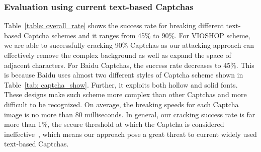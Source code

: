 \subsubsection{Evaluation using current text-based Captchas}
Table~\ref{table: overall_rate} shows the success rate for breaking different text-based Captcha schemes and it ranges from 45\% to 90\%. For VIOSHOP scheme, we are able to successfully cracking 90\% Captchas as our attacking approach can effectively remove the complex background as well as expand the space of adjacent characters. For Baidu Captchas, the success rate decreases to 45\%. This is because Baidu uses almost two different styles of Captcha scheme shown in Table~\ref{tab: captcha_show}. Further, it exploits both hollow and solid fonts. These designs make such scheme more complex than other Captchas and more difficult to be recognized.
On average, the breaking speeds for each Captcha image is no more than 80 milliseconds.
In general, our cracking success rate is far more than 1\%, the secure threshold at which the Captcha is considered ineffective~\cite{Bursztein2011Text}, which means our approach pose a great threat to current widely used text-based Captchas.

